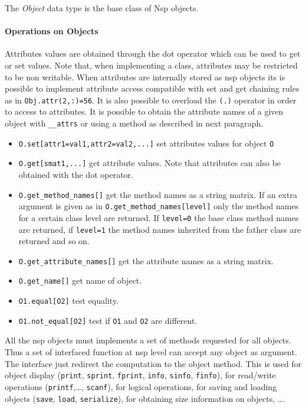 
\begin{mandesc}
\end{mandesc}

\begin{mandescription}
The \emph{Object} data type is the base class of Nsp objects. 
\end{mandescription}

\paragraph{Operations on Objects}
Attributes values are obtained through the dot operator which can be used to get or set 
values. Note that, when implementing a class, attributes may be restricted to be non writable.
When attributes are internally stored as nsp objects its is possible to implement attribute 
access compatible with set and get chaining rules as in \verb+Obj.attr(2,:)=56+. It is also 
possible to overload the \verb+(.)+ operator in order to access to attributes. 
It is possible to obtain the attribute names of a given object with \verb+__attrs+ or using 
a method as described in next paragraph.
\begin{itemize}
\item \verb+O.set[attr1=val1,attr2=val2,...]+  set attributes values for object \verb+O+ 
\item \verb+O.get[smat1,...]+ get attribute values. Note that attributes can also be obtained with the dot 
  operator.
\item \verb+O.get_method_names[]+ get the method names as a string matrix. If an extra argument is given 
  as in \verb+O.get_method_names[level]+ only the method names for a certain class level are returned. If 
  \verb+level=0+ the base class method names are returned, if \verb+level=1+ the method names inherited from the 
  father class are returned and so on.
\item \verb+O.get_attribute_names[]+ get the attribute names as a string matrix.
\item \verb+O.get_name[]+ get name of object. 
\item \verb+O1.equal[O2]+ test equality. 
\item \verb+O1.not_equal[O2]+ test if \verb!O1! and \verb!O2! are different.
\end{itemize}

All the nsp objects must implements a set of methods requested for all objects. 
Thus a set of interfaced function at nsp level can accept any object as argument. 
The interface just redirect the computation to the object method. 
This is used for object display (\verb+print+, \verb+sprint+, \verb+fprint+, 
\verb+info+, \verb+sinfo+, \verb+finfo+), for read/write operations (\verb+printf+,\ldots, 
\verb+scanf+), for logical operations, for saving and loading objects (\verb+save+, \verb+load+, 
\verb+serialize+), for obtaining size information on objects, \ldots.

